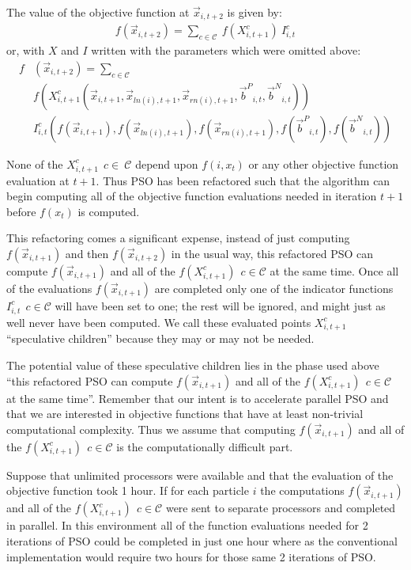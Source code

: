 \documentclass[journal,letterpaper]{IEEEtran}
\providecommand{\pers}{\ensuremath{P}}
\providecommand{\neigh}{\ensuremath{N}}
\providecommand{\ppos}{\ensuremath{\Vec{x}}}
\providecommand{\nbest}{\ensuremath{\Vec{b}^\neigh}}
\providecommand{\pbest}{\ensuremath{\Vec{b}^\pers}}
\providecommand{\ofunc}{\ensuremath{f}}
\providecommand{\indic}{\ensuremath{I}}
\providecommand{\specpos}{\ensuremath{X}}
\providecommand{\ln}{\ensuremath{ln}}
\providecommand{\rn}{\ensuremath{rn}}
\providecommand{\caseset}{\ensuremath{\mathcal{C}}}
\begin{document}
The value of the objective function at $\ppos_{i,t+2}$ is given by:
\begin{align}
\label{eq:pos2value}
	\ofunc (\ppos_{i,t+2}) = \sum_{c \in \caseset} \ \ofunc(\specpos_{i,t+1}^{c}) \ \indic_{i,t}^{c}
\end{align}
or, with $\specpos$ and $\indic$ written with the parameters which were omitted above:
\begin{align}
\nonumber
\ofunc & (\ppos_{i,t+2}) = \sum_{c \in \caseset} \\
\nonumber
& \ofunc(\specpos_{i,t+1}^{c}(\ppos_{i,t+1} ,\ppos_{\ln(i),t+1},\ppos_{\rn(i),t+1} ,\pbest_{i,t} ,\nbest_{i,t})) \\
\label{eq:pos2valuelong}
& \indic_{i,t}^{c}(\ofunc ( \ppos_{i,t+1} ) ,\ofunc(\ppos_{\ln(i),t+1}),\ofunc(\ppos_{\rn(i),t+1}) ,\ofunc(\pbest_{i,t}) ,\ofunc(\nbest_{i,t}))
\end{align}

None of the $\specpos_{i,t+1}^{c} \ \ c \in\ \caseset$ depend upon $f(i,x_t)$
or any other objective function evaluation at $t+1$.
Thus PSO has been refactored such that the algorithm can begin computing
all of the objective function evaluations needed in iteration $t+1$ before $f(x_t)$ is computed.

This refactoring comes a significant expense, instead of just computing
$\ofunc(\ppos_{i,t+1})$ and then $\ofunc(\ppos_{i,t+2})$ in the usual way, this refactored PSO
can compute $\ofunc(\ppos_{i,t+1})$ and all 
of the $\ofunc(\specpos_{i,t+1}^{c}) \ \ c \in \caseset$ at the same time.
Once all of the evaluations $f(\ppos_{i,t+1})$ are completed only one
of the indicator functions $\indic_{i,t}^{c} \ \ c \in \caseset$ will have been set to one;
the rest will be ignored, and might just as well never have been computed.
We call these evaluated points $\specpos_{i,t+1}^{c}$ ``speculative children''
because they may or may not be needed.

The potential value of these speculative children lies in the phase used above
``this refactored PSO
can compute $\ofunc(\ppos_{i,t+1})$ and all 
of the $\ofunc(\specpos_{i,t+1}^{c}) \ \ c \in \caseset$ at the same time''. 
Remember that our intent is to accelerate parallel PSO and that we
are interested in objective functions that have at least non-trivial computational
complexity.
Thus we assume that computing
$\ofunc(\ppos_{i,t+1})$ and all 
of the $\ofunc(\specpos_{i,t+1}^{c}) \ \ c \in \caseset$ is the computationally difficult part.

Suppose that unlimited processors were available and that the evaluation of 
the objective function took 1 hour. If for each particle $i$ 
the computations
$\ofunc(\ppos_{i,t+1})$ and all 
of the $\ofunc(\specpos_{i,t+1}^{c}) \ \ c \in \caseset$ were sent to separate
processors and completed in parallel.
In this environment all of the function evaluations needed for 2 iterations of PSO
could be completed in just one hour where as the conventional implementation would
require two hours for those same 2 iterations of PSO.
\end{document}
